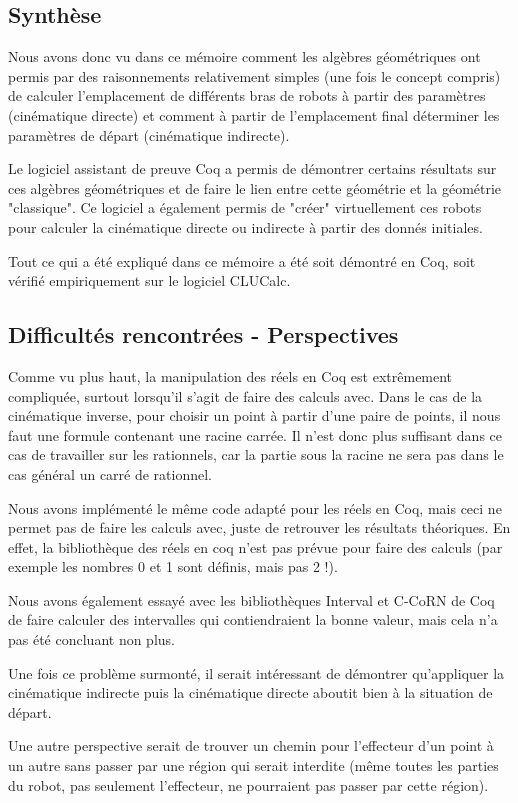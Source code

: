\subsection{Synthèse}

Nous avons donc vu dans ce mémoire comment les algèbres géométriques ont permis par des raisonnements relativement simples (une fois le concept compris) de calculer l'emplacement de différents bras de robots à partir des paramètres (cinématique directe) et comment à partir de l'emplacement final déterminer les paramètres de départ (cinématique indirecte).

Le logiciel assistant de preuve Coq a permis de démontrer certains résultats sur ces algèbres géométriques et de faire le lien entre cette géométrie et la géométrie "classique". Ce logiciel a également permis de "créer" virtuellement ces robots pour calculer la cinématique directe ou indirecte à partir des donnés initiales. 

Tout ce qui a été expliqué dans ce mémoire a été soit démontré en Coq, soit vérifié empiriquement sur le logiciel CLUCalc. 

\subsection{Difficultés rencontrées - Perspectives }

Comme vu plus haut, la manipulation des réels en Coq est extrêmement compliquée, surtout lorsqu'il s'agit de faire des calculs avec. Dans le cas de la cinématique inverse, pour choisir un point à partir d'une paire de points, il nous faut une formule contenant une racine carrée. Il n'est donc plus suffisant dans ce cas de travailler sur les rationnels, car la partie sous la racine ne sera pas dans le cas général un carré de rationnel.

Nous avons implémenté le même code adapté pour les réels en Coq, mais ceci ne permet pas de faire les calculs avec, juste de retrouver les résultats théoriques. En effet, la bibliothèque des réels en coq n'est pas prévue pour faire des calculs (par exemple les nombres 0 et 1 sont définis, mais pas 2 !). 

Nous avons également essayé avec les bibliothèques Interval et C-CoRN de Coq de faire calculer des intervalles qui contiendraient la bonne valeur, mais cela n'a pas été concluant non plus. 

Une fois ce problème surmonté, il serait intéressant de démontrer qu'appliquer la cinématique indirecte puis la cinématique directe aboutit bien à la situation de départ. 

Une autre perspective serait de trouver un chemin pour l'effecteur d'un point à un autre sans passer par une région qui serait interdite (même toutes les parties du robot, pas seulement l'effecteur, ne pourraient pas passer par cette région). 




\nocite{*}


